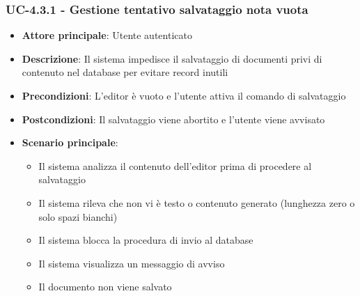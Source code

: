 \documentclass[11pt,a4paper]{article}
\begin{document}
\subsubsection{UC-4.3.1 - Gestione tentativo salvataggio nota vuota}
\begin{itemize}
    \item \textbf{Attore principale}: Utente autenticato
    \item \textbf{Descrizione}: Il sistema impedisce il salvataggio di documenti privi di contenuto nel database per evitare record inutili
    \item \textbf{Precondizioni}: L’editor è vuoto e l'utente attiva il comando di salvataggio
    \item \textbf{Postcondizioni}: Il salvataggio viene abortito e l'utente viene avvisato
    \item \textbf{Scenario principale}:
    \begin{itemize}
        \item Il sistema analizza il contenuto dell'editor prima di procedere al salvataggio
        \item Il sistema rileva che non vi è testo o contenuto generato (lunghezza zero o solo spazi bianchi)
        \item Il sistema blocca la procedura di invio al database
        \item Il sistema visualizza un messaggio di avviso
        \item Il documento non viene salvato
    \end{itemize}
\end{itemize}
\end{document}
